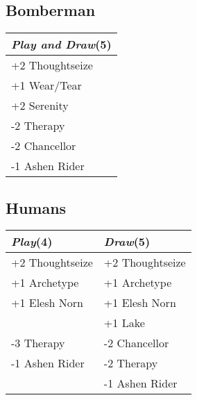 \documentclass{article}
\renewcommand *\contentsname{Contents}
\begin{document}
\begin{multicols}{2}
\subsection*{Bomberman}
\begin{center}
\begin{tabular}{| l |}
\hline
\textit{Play and Draw}(5) \\
\hline
\cellcolor[HTML]{BBDDBB}\small{+2 Thoughtseize}\\
\cellcolor[HTML]{BBDDBB}\small{+1 Wear/Tear}\\
\cellcolor[HTML]{BBDDBB}\small{+2 Serenity}\\
\cellcolor[HTML]{DDBBBB}\small{-2 Therapy}\\
\cellcolor[HTML]{DDBBBB}\small{-2 Chancellor}\\
\cellcolor[HTML]{DDBBBB}\small{-1 Ashen Rider}\\
\hline
\end{tabular}
\end{center}
\subsection*{Humans}
\begin{center}
\begin{tabular}{| l | l |}
\hline
\textit{Play}(4) & \textit{Draw}(5) \\
\hline
\cellcolor[HTML]{BBDDBB}\small{+2 Thoughtseize} & \cellcolor[HTML]{BBDDBB}\small{+2 Thoughtseize}\\
\cellcolor[HTML]{BBDDBB}\small{+1 Archetype} & \cellcolor[HTML]{BBDDBB}\small{+1 Archetype}\\
\cellcolor[HTML]{BBDDBB}\small{+1 Elesh Norn} & \cellcolor[HTML]{BBDDBB}\small{+1 Elesh Norn}\\
 & \cellcolor[HTML]{BBDDBB}\small{+1 Lake}\\
\cellcolor[HTML]{DDBBBB}\small{-3 Therapy} & \cellcolor[HTML]{DDBBBB}\small{-2 Chancellor}\\
\cellcolor[HTML]{DDBBBB}\small{-1 Ashen Rider} & \cellcolor[HTML]{DDBBBB}\small{-2 Therapy}\\
 & \cellcolor[HTML]{DDBBBB}\small{-1 Ashen Rider}\\
\hline
\end{tabular}
\end{center}
\end{multicols}
\end{document}
